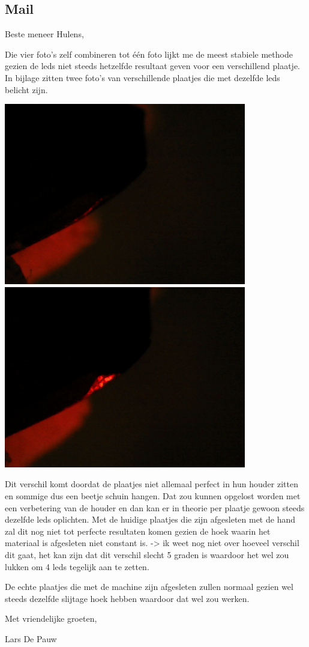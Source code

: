 \documentclass{scrartcl}
\begin{document}
\subsection{Mail}

Beste meneer Hulens,

 

Die vier foto’s zelf combineren tot één foto lijkt me de meest stabiele methode gezien de leds niet steeds hetzelfde resultaat geven voor een verschillend plaatje. In bijlage zitten twee foto’s van verschillende plaatjes die met dezelfde leds belicht zijn.



\includegraphics[width=4.166667in, keepaspectratio=true]{./Masterproef_Tool_Wear_Inspection_-_Update_3_DH/p3_l9.png}\includegraphics[width=4.166667in, keepaspectratio=true]{./Masterproef_Tool_Wear_Inspection_-_Update_3_DH/p4_l9.png}

 

Dit verschil komt doordat de plaatjes niet allemaal perfect in hun houder zitten en sommige dus een beetje schuin hangen. Dat zou kunnen opgelost worden met een verbetering van de houder en dan kan er in theorie per plaatje gewoon steeds dezelfde leds oplichten. Met de huidige plaatjes die zijn afgesleten met de hand zal dit nog niet tot perfecte resultaten komen gezien de hoek waarin het materiaal is afgesleten niet constant is. -\textgreater{} ik weet nog niet over hoeveel verschil dit gaat, het kan zijn dat dit verschil slecht 5 graden is waardoor het wel zou lukken om 4 leds tegelijk aan te zetten.

De echte plaatjes die met de machine zijn afgesleten zullen normaal gezien wel steeds dezelfde slijtage hoek hebben waardoor dat wel zou werken.

 

Met vriendelijke groeten,

 

Lars De Pauw
\end{document}
